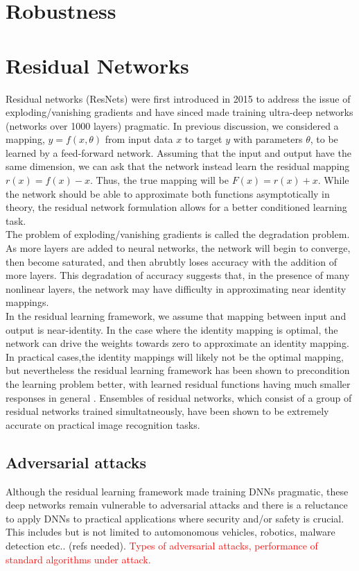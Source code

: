 \documentclass[12pt]{article}
\begin{document}
\section*{Robustness}
\section{Residual Networks}
Residual networks (ResNets) were first introduced in 2015 to address the issue of exploding/vanishing gradients and have sinced made training ultra-deep networks (networks over 1000 layers) pragmatic. In previous discussion, we considered a mapping, $y = f(x,\theta)$ from input data $x$ to target $y$ with parameters $\theta$, to be learned by a feed-forward network. Assuming that the input and output have the same dimension, we can ask that the network instead learn the residual mapping $r(x) = f(x)-x$. Thus, the true mapping will be $F(x) = r(x) + x$. While the network should be able to approximate both functions asymptotically in theory, the residual network formulation allows for a better conditioned learning task. \\
\indent The problem of exploding/vanishing gradients is called the degradation problem. As more layers are added to neural networks, the network will begin to converge, then become saturated, and then abrubtly loses accuracy with the addition of more layers. This degradation of accuracy suggests that, in the presence of many nonlinear layers, the network may have difficulty in approximating near identity mappings. \\
\indent In the residual learning framework, we assume that mapping between input and output is near-identity. In the case where the identity mapping is optimal, the network can drive the weights towards zero to approximate an identity mapping. In practical cases,the identity mappings will likely not be the optimal mapping, but nevertheless the residual learning framework has been shown to precondition the learning problem better, with learned residual functions having much smaller responses in general \cite{res}. Ensembles of residual networks, which consist of a group of residual networks trained simultatneously, have been shown to be extremely accurate on practical image recognition tasks.
\subsection{Adversarial attacks}
Although the residual learning framework made training DNNs pragmatic, these deep networks remain vulnerable to adversarial attacks and there is a reluctance to apply DNNs to practical applications where security and/or safety is crucial. This includes but is not limited to automonomous vehicles, robotics, malware detection etc.. (refs needed).
\textcolor{red}{Types of adversarial attacks, performance of standard algorithms under attack.}
\end{document}
